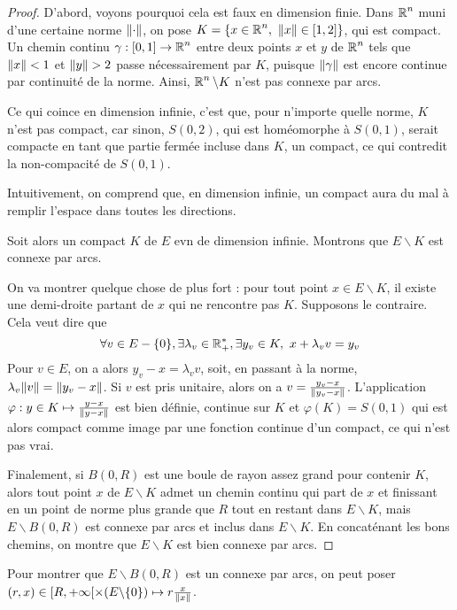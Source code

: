 \documentclass[10pt]{scrartcl}
\begin{document}
    \begin{proof}
        D'abord, voyons pourquoi cela est faux en dimension finie. 
        Dans $\operatorname{\mathbb R}^n$ muni d'une certaine norme $\lVert \cdot\rVert$, on pose $K=\lbrace x\in\R^n,\ \norm{x}\in[1,2]\rbrace$, qui est compact. 
        Un chemin continu $\gamma:[0,1]\to \operatorname{\mathbb R}^n$ entre deux points $x$ et $y$ de $\operatorname{\mathbb R}^n$ tels que $\lVert x\rVert<1$ et $\lVert y\rVert>2$ passe nécessairement par $K$, puisque $\lVert \gamma\rVert$ est encore continue par continuité de la norme. 
        Ainsi, $\operatorname{\mathbb R}^n\backslash K$ n'est pas connexe par arcs. 

        Ce qui coince en dimension infinie, c'est que, pour n'importe quelle norme, $K$ n'est pas compact, car sinon, $S(0,2)$, qui est homéomorphe à $S(0,1)$, serait compacte en tant que partie fermée incluse dans $K$, un compact,
        ce qui contredit la non-compacité de $S(0,1)$. 

        Intuitivement, on comprend que, en dimension infinie, un compact aura du mal à remplir l'espace dans toutes les directions.
        
        Soit alors un compact $K$ de $E$ evn de dimension infinie. Montrons que $E\backslash K$ est connexe par arcs. 

        On va montrer quelque chose de plus fort : pour tout point $x\in E\backslash K$, il existe une demi-droite partant de $x$ qui ne rencontre pas $K$. 
        Supposons le contraire. Cela veut dire que 
        \[
            \forall v\in E-\lbrace 0\rbrace, \exists\lambda_v\in\operatorname{\mathbb R}_+^*,\exists y_v\in K,\ x+\lambda_vv=y_v
        \]
        Pour $v\in E$, on a alors $y_v-x=\lambda_vv$, soit, en passant à la norme, $\lambda_v\lVert v\rVert=\lVert y_v-x\rVert$. 
        Si $v$ est pris unitaire, alors on a $v=\frac{y_v-x}{\lVert y_v-x\rVert}$.
        L'application $\varphi:y\in K\mapsto \frac{y-x}{\lVert y-x\rVert}$ est bien définie, continue sur $K$ et $\varphi(K)=S(0,1)$ qui est alors compact comme image par une fonction continue d'un compact, ce qui n'est pas vrai.

        Finalement, si $B(0,R)$ est une boule de rayon assez grand pour contenir $K$, alors tout point $x$ de $E\backslash K$ admet un chemin continu qui part de $x$ et finissant en un point de norme plus grande que $R$ tout en restant dans $E\backslash K$, mais $E\backslash B(0,R)$ est connexe par arcs et inclus dans $E\backslash K$. 
        En concaténant les bons chemins, on montre que $E\backslash K$ est bien connexe par arcs.
    \end{proof}

    \begin{remarks}
        Pour montrer que $E\backslash B(0,R)$ est un connexe par arcs, on peut poser $(r,x)\in[R,+\infty[\times(E\backslash\lbrace 0\rbrace)\mapsto r\frac x{\lVert x\rVert}$.
    \end{remarks}
\end{document}
